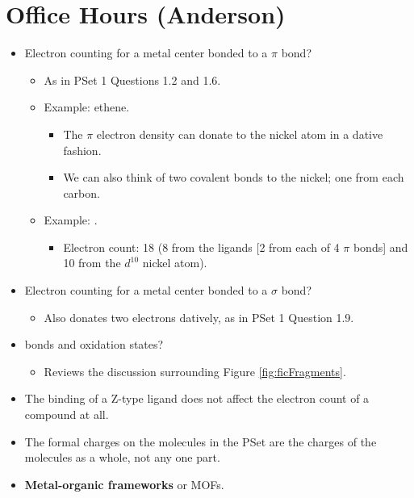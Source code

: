 \documentclass[../notes.tex]{subfiles}
\begin{document}
\section{Office Hours (Anderson)}
\begin{itemize}
    \item {}Electron counting for a metal center bonded to a $\pi$ bond?
    \begin{itemize}
        \item As in PSet 1 Questions 1.2 and 1.6.
        \item Example: ethene.
        \begin{itemize}
            \item The $\pi$ electron density can donate to the nickel atom in a dative fashion.
            \item We can also think of two covalent bonds to the nickel; one from each carbon.
        \end{itemize}
        \item Example: .
        \begin{itemize}
            \item Electron count: 18 (8 from the ligands [2 from each of 4 $\pi$ bonds] and 10 from the $d^{10}$ nickel atom).
        \end{itemize}
    \end{itemize}
    \item Electron counting for a metal center bonded to a $\sigma$ bond?
    \begin{itemize}
        \item Also donates two electrons datively, as in PSet 1 Question 1.9.
    \end{itemize}
    \item {} bonds and oxidation states?
    \begin{itemize}
        \item Reviews the discussion surrounding Figure \ref{fig:ficFragments}.
    \end{itemize}
    \item The binding of a Z-type ligand does not affect the electron count of a compound at all.
    \item The formal charges on the molecules in the PSet are the charges of the molecules as a whole, not any one part.
    \item \textbf{Metal-organic frameworks} or MOFs.
\end{itemize}
\end{document}
